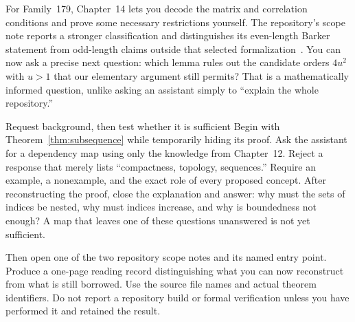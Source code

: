 For Family~179, Chapter~14 lets you decode the matrix and correlation conditions and prove some necessary restrictions yourself. The repository's scope note reports a stronger classification and distinguishes its even-length Barker statement from odd-length claims outside that selected formalization~\cite{oai179}. You can now ask a precise next question: which lemma rules out the candidate orders $4u^2$ with $u>1$ that our elementary argument still permits? That is a mathematically informed question, unlike asking an assistant simply to ``explain the whole repository.''

\begin{lab}{Request background, then test whether it is sufficient}
Begin with Theorem~\ref{thm:subsequence} while temporarily hiding its proof. Ask the assistant for a dependency map using only the knowledge from Chapter~12. Reject a response that merely lists ``compactness, topology, sequences.'' Require an example, a nonexample, and the exact role of every proposed concept. After reconstructing the proof, close the explanation and answer: why must the sets of indices be nested, why must indices increase, and why is boundedness not enough? A map that leaves one of these questions unanswered is not yet sufficient.

Then open one of the two repository scope notes and its named entry point. Produce a one-page reading record distinguishing what you can now reconstruct from what is still borrowed. Use the source file names and actual theorem identifiers. Do not report a repository build or formal verification unless you have performed it and retained the result.
\end{lab}
